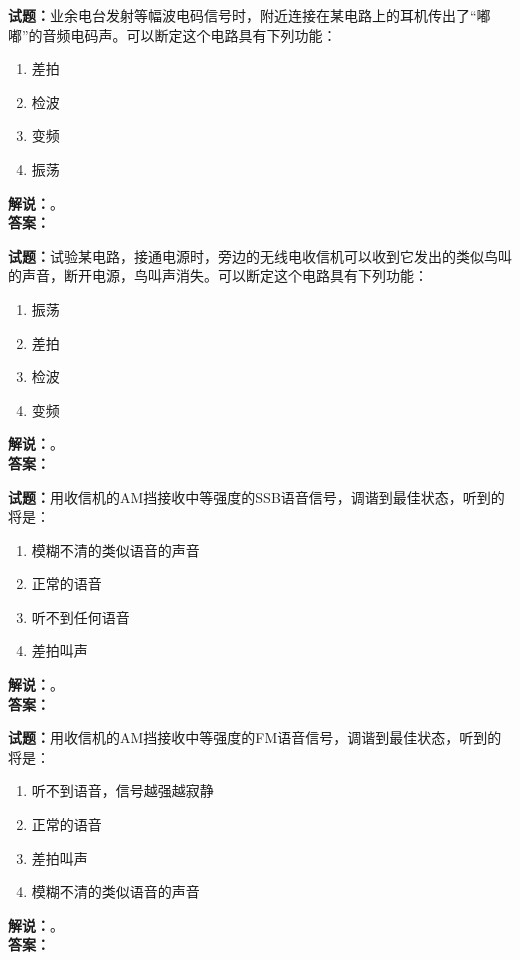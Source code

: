 \documentclass{ctexbook}
\begin{document}
\vspace{\baselineskip}

\noindent\textbf{试题：}业余电台发射等幅波电码信号时，附近连接在某电路上的耳机传出了“嘟嘟”的音频电码声。可以断定这个电路具有下列功能：
\begin{enumerate}[leftmargin=3em]
  \item 差拍
  \item 检波
  \item 变频
  \item 振荡
\end{enumerate}
\noindent\textbf{解说：}\textbf{}。\\\noindent\textbf{答案：}

\vspace{\baselineskip}

\noindent\textbf{试题：}试验某电路，接通电源时，旁边的无线电收信机可以收到它发出的类似鸟叫的声音，断开电源，鸟叫声消失。可以断定这个电路具有下列功能：
\begin{enumerate}[leftmargin=3em]
  \item 振荡
  \item 差拍
  \item 检波
  \item 变频
\end{enumerate}
\noindent\textbf{解说：}\textbf{}。\\\noindent\textbf{答案：}

\vspace{\baselineskip}

\noindent\textbf{试题：}用收信机的AM挡接收中等强度的SSB语音信号，调谐到最佳状态，听到的将是：
\begin{enumerate}[leftmargin=3em]
  \item 模糊不清的类似语音的声音
  \item 正常的语音
  \item 听不到任何语音
  \item 差拍叫声
\end{enumerate}
\noindent\textbf{解说：}\textbf{}。\\\noindent\textbf{答案：}

\vspace{\baselineskip}

\noindent\textbf{试题：}用收信机的AM挡接收中等强度的FM语音信号，调谐到最佳状态，听到的将是：
\begin{enumerate}[leftmargin=3em]
  \item 听不到语音，信号越强越寂静
  \item 正常的语音
  \item 差拍叫声
  \item 模糊不清的类似语音的声音
\end{enumerate}
\noindent\textbf{解说：}\textbf{}。\\\noindent\textbf{答案：}
\end{document}

